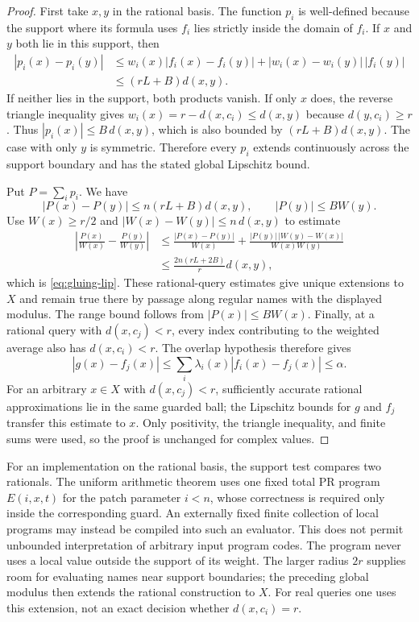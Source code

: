 \begin{proof}
First take $x,y$ in the rational basis.  The function $p_i$ is
well-defined because the support where its
formula uses $f_i$ lies strictly inside the domain of $f_i$.
If $x$ and $y$ both lie in this support, then
\begin{align*}
 |p_i(x)-p_i(y)|
 &\le w_i(x)|f_i(x)-f_i(y)|
   +|w_i(x)-w_i(y)|\,|f_i(y)|\\
 &\le (rL+B)d(x,y).
\end{align*}
If neither lies in the support, both products vanish.  If only $x$
does, the reverse triangle inequality gives
$w_i(x)=r-d(x,c_i)\le d(x,y)$ because $d(y,c_i)\ge r$.
Thus $|p_i(x)|\le B\,d(x,y)$, which is also bounded by
$(rL+B)d(x,y)$.  The case with only $y$ is symmetric.  Therefore every
$p_i$ extends continuously across the support boundary and has the
stated global Lipschitz bound.

Put $P=\sum_i p_i$.  We have
\[
 |P(x)-P(y)|\le n(rL+B)d(x,y),\qquad |P(y)|\le B W(y).
\]
Use $W(x)\ge r/2$ and $|W(x)-W(y)|\le n\,d(x,y)$ to estimate
\begin{align*}
 \left|\frac{P(x)}{W(x)}-\frac{P(y)}{W(y)}\right|
 &\le \frac{|P(x)-P(y)|}{W(x)}
   +\frac{|P(y)|\,|W(y)-W(x)|}{W(x)W(y)}\\
 &\le\frac{2n(rL+2B)}{r}d(x,y),
\end{align*}
which is \eqref{eq:gluing-lip}.  These rational-query estimates give
unique extensions to $X$ and remain true there by passage along
regular names with the displayed modulus.  The range bound follows
from $|P(x)|\le BW(x)$.  Finally, at a rational query with
$d(x,c_j)<r$, every index contributing
to the weighted average also has $d(x,c_i)<r$.  The overlap hypothesis
therefore gives
\[
 |g(x)-f_j(x)|
 \le\sum_i\lambda_i(x)|f_i(x)-f_j(x)|\le\alpha.
\]
For an arbitrary $x\in X$ with $d(x,c_j)<r$, sufficiently accurate
rational approximations lie in the same guarded ball; the Lipschitz
bounds for $g$ and $f_j$ transfer this estimate to $x$.
Only positivity, the triangle inequality, and finite sums were used,
so the proof is unchanged for complex values.
\end{proof}

For an implementation on the rational basis, the support test compares
two rationals.  The uniform arithmetic theorem uses one fixed total
PR program $E(i,x,t)$ for the patch parameter $i<n$, whose correctness
is required only inside the corresponding guard.  An externally
fixed finite collection of local programs may instead be compiled into
such an evaluator.  This does not permit unbounded interpretation of
arbitrary input program codes.  The program never
uses a local value outside the support of its weight.  The larger
radius $2r$ supplies room for evaluating names near support boundaries;
the preceding global modulus then extends the rational construction to
$X$.  For real queries one uses this extension, not an exact decision
whether $d(x,c_i)=r$.

